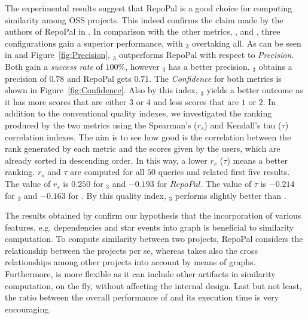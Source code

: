 The experimental results suggest that RepoPal is a good choice for computing similarity among OSS projects. This indeed confirms the claim made by the authors of RepoPal in \cite{10.1109/SANER.2017.7884605}. In comparison with the other metrics, \ie \MUDABlue, \CLAN and \RepoPal, three \CrossSim configurations gain a superior performance, with \CrossSimA$_{3}$ overtaking all. As can be seen in and Figure~\ref{fig:Precision}, \CrossSimA$_{3}$ outperforms RepoPal with respect to \textit{Precision}. Both gain a \textit{success rate} of $100\%$, however \CrossSimA$_{3}$ has a better precision. \CrossSimA$_{3}$ obtains a precision of $0.78$ and RepoPal gets $0.71$. The \textit{Confidence} for both metrics is shown in Figure~\ref{fig:Confidence}. Also by this index, \CrossSimA$_{3}$ yields a better outcome as it has more scores that are either $3$ or $4$ and less scores that are $1$ or $2$. In addition to the conventional quality indexes, we investigated the ranking produced by the two metrics using the Spearman's ($r_s$)  and  Kendall's tau ($\tau$) correlation indexes. 
The aim is to see how good is the correlation between the rank generated by each metric and the scores given by the users, which are already sorted in descending order. In this way, a lower $r_s$ ($\tau$) means a better ranking. $r_s$ and $\tau$ are computed for all $50$ queries and related first five results. The value of $r_s$ is $0.250$  for \CrossSimA$_{3}$ and $-0.193$   for $RepoPal$. The value of $\tau$ is $-0.214$  for \CrossSimA$_{3}$ and $-0.163$ for \RepoPal. By this quality index, \CrossSimA$_{3}$ performs slightly better than \RepoPal. 


The results obtained by \CrossSim confirm our hypothesis that the incorporation of various features, e.g. dependencies and star events into graph is beneficial to similarity computation. To compute similarity between two projects, RepoPal considers the relationship between the projects per se, whereas \CrossSim takes also the cross relationships among other projects into account by means of graphs. Furthermore, \CrossSim is more flexible as it can include other artifacts in similarity computation, on the fly, without affecting the internal design. Last but not least, the ratio between the overall performance of \CrossSim and its execution time is very encouraging.


